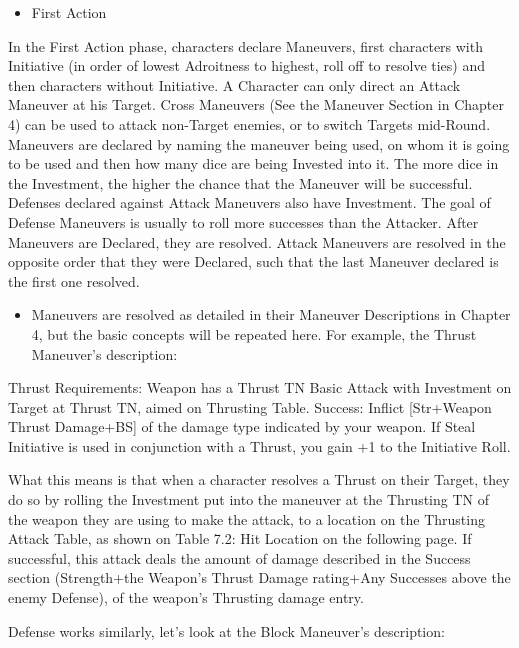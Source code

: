 \documentclass[oneside,11pt,english]{book}
\begin{document}
 
\begin{itemize}
\item First Action 
\end{itemize}
In the First Action phase, characters declare Maneuvers, first characters with Initiative (in order of lowest 
Adroitness to highest, roll off to resolve ties) and then characters without Initiative. A Character can only 
direct an Attack Maneuver at his Target. Cross Maneuvers (See the Maneuver Section in Chapter 4) can 
be used to attack non-Target enemies, or to switch Targets mid-Round. 
Maneuvers are declared by naming the maneuver being used, on whom it is going to be used and then 
how many dice are being Invested into it. The more dice in the Investment, the higher the chance that the 
Maneuver will be successful. 
Defenses declared against Attack Maneuvers also have Investment. The goal of Defense Maneuvers is 
usually to roll more successes than the Attacker. 
After Maneuvers are Declared, they are resolved. Attack Maneuvers are resolved in the opposite order 
that they were Declared, such that the last Maneuver declared is the first one resolved. 
\begin{itemize}
\item Maneuvers are resolved as detailed in their Maneuver Descriptions in Chapter 4, but the basic 
concepts will be repeated here. 
For example, the Thrust Maneuver’s description: 
\end{itemize}
 

Thrust 
Requirements: Weapon has a Thrust TN 
Basic Attack with Investment on Target at Thrust TN, aimed on Thrusting Table. 
Success: Inflict [Str+Weapon Thrust Damage+BS] of the damage type indicated by your 
weapon. 
If Steal Initiative is used in conjunction with a Thrust, you gain +1 to the Initiative Roll. 

 

What this means is that when a character resolves a Thrust on their Target, they do so by rolling 
the Investment put into the maneuver at the Thrusting TN of the weapon they are using to make 
the attack, to a location on the Thrusting Attack Table, as shown on Table 7.2: Hit Location on 
the following page. 
If successful, this attack deals the amount of damage described in the Success section 
(Strength+the Weapon’s Thrust Damage rating+Any Successes above the enemy Defense), of the 
weapon’s Thrusting damage entry. 

 

Defense works similarly, let’s look at the Block Maneuver’s description: 
\end{document}
